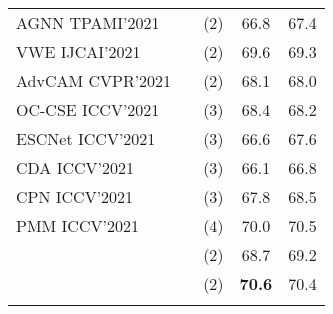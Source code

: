 \begin{table}[!tp]
\begin{tabular}{l|c|c|cc}
    AGNN \tiny TPAMI'2021                          &                                   & (2)                           & 66.8          & 67.4                                                                                      \\
    VWE \tiny IJCAI'2021                               &                                   & (2)                 & 69.6          & 69.3                                                                                      \\
    AdvCAM \tiny CVPR'2021                             &                                   & (2)                           & 68.1          & 68.0                                                                                      \\
    OC-CSE \tiny ICCV'2021                             &                                   & (3)                           & 68.4          & 68.2                                                                                      \\
    ESCNet \tiny ICCV'2021                             &                                   & (3)                           & 66.6          & 67.6                                                                                      \\
    CDA \tiny ICCV'2021                                &                                   & (3)                           & 66.1          & 66.8                                                                                      \\
    CPN \tiny ICCV'2021                                &                                   & (3)                           & 67.8          & 68.5                                                                                      \\
    PMM \tiny ICCV'2021                                &                                   & (4)                           & 70.0          & 70.5                                                                                      \\
    \rowcolor[HTML]{fafafa}
                                                       &                                   & (2)                           & 68.7          & 69.2\tablefootnote{\url{http://host.robots.ox.ac.uk:8080/anonymous/XJDOJG.html}}          \\
    \rowcolor[HTML]{fafafa}
    \multirow{-2}{*}{Ours-M}                           &                                   & (2)                 & \textbf{70.6} & 70.4\tablefootnote{\url{http://host.robots.ox.ac.uk:8080/anonymous/J00QBG.html}}          \\\rowcolor[HTML]{eaeaea}

\end{tabular}
\end{table}
